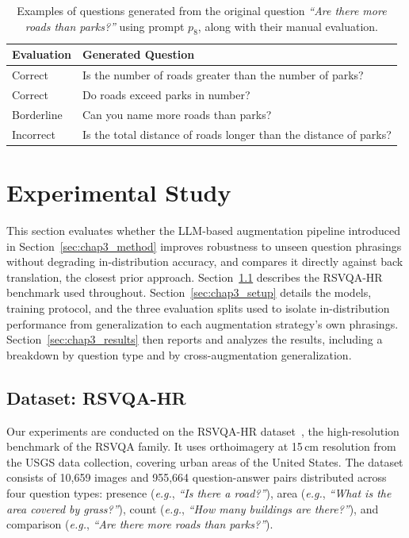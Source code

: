 \begin{table}[ht]
\centering
\small

\begin{tabular}{ll}
\hline
\textbf{Evaluation} & \textbf{Generated Question} \\
\hline
Correct    & Is the number of roads greater than the number of parks? \\
Correct    & Do roads exceed parks in number? \\
Borderline & Can you name more roads than parks? \\
Incorrect  & Is the total distance of roads longer than the distance of parks? \\
\hline
\end{tabular}
\caption{Examples of questions generated from the original
question \textit{``Are there more roads than parks?''}
using prompt $p_8$, along with their manual evaluation.}
\label{tab:generated_examples}
\end{table}


\section{Experimental Study}
\label{sec:chap3_experiments}
 This section evaluates whether the LLM-based augmentation pipeline introduced in 
 Section~\ref{sec:chap3_method} improves robustness to unseen question phrasings without degrading in-distribution accuracy, 
 and compares it directly against back translation, the closest prior approach. Section~\ref{sec:chap3_dataset} describes the RSVQA-HR benchmark used throughout. 
 Section~\ref{sec:chap3_setup} details the models, training protocol, and the three evaluation splits used to isolate in-distribution performance from generalization to each augmentation strategy's own phrasings. 
 Section~\ref{sec:chap3_results} then reports and analyzes the results, including a breakdown by question type and by cross-augmentation generalization.
\subsection{Dataset: RSVQA-HR}
\label{sec:chap3_dataset}
 
Our experiments are conducted on the RSVQA-HR
dataset~\cite{lobry2020rsvqa}, the high-resolution
benchmark of the RSVQA family. It uses orthoimagery
at 15\,cm resolution from the USGS data collection,
covering urban areas of the United States. The dataset
consists of 10,659 images and 955,664 question-answer
pairs distributed across four question types: presence
(\textit{e.g.}, \textit{``Is there a road?''}), area
(\textit{e.g.}, \textit{``What is the area covered by
grass?''}), count (\textit{e.g.}, \textit{``How many
buildings are there?''}), and comparison (\textit{e.g.},
\textit{``Are there more roads than parks?''}).
 
